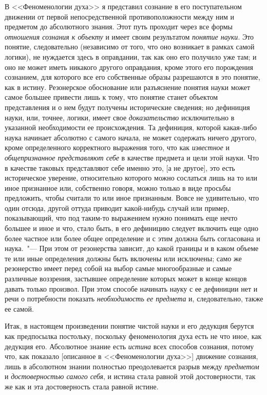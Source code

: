 В <<Феноменологии духа>> я представил сознание в
его поступательном движении от первой непосредственной
противоположности между ним и предметом до
абсолютного знания. Этот путь проходит через все формы
\emph{отношения сознания к объекту} и имеет своим
результатом \emph{понятие науки}. Это понятие, следовательно
(независимо от того, что оно возникает в рамках самой
логики), не нуждается здесь в оправдании, так как оно
его получило уже там; и оно не может иметь никакого
другого оправдания, кроме этого его порождения сознанием,
для которого все его собственные образы разрешаются
в это понятие, как в истину. Резонерское обоснование
или разъяснение понятия науки может самое большее
привести лишь к тому, что понятие станет объектом
представления и о нем будут получены исторические
сведения; но дефиниция науки, или, точнее, логики,
имеет свое \emph{доказательство} исключительно в указанной
необходимости ее происхождения. Та дефиниция, которой
какая-либо наука начинает абсолютно с самого начала,
не может содержать ничего другого, кроме определенного
корректного выражения того, что как \emph{известное}
и \emph{общепризнанное представляют себе} в качестве предмета
и цели этой науки. Что в качестве таковых представляют
себе именно это, [а не другое], это есть историческое
уверение, относительно которого можно сослаться
лишь на то или иное признанное или, собственно говоря,
можно только в виде просьбы предложить, чтобы считали
то или иное признанным. Вовсе не удивительно, что
один отсюда, другой оттуда приводит какой-нибудь случай
или пример, показывающий, что под таким-то выражением
нужно понимать еще нечто большее и иное и
что, стало быть, в его дефиницию следует включить еще
одно более частное или более общее определение и с
этим должна быть согласована и наука.~"--- При этом от
резонерства зависит, до какой границы и в каком объеме
те или иные определения должны быть включены или
исключены; само же резонерство имеет перед собой на
выбор самые многообразные и самые различные воззрения,
застывшее определение которых может в конце
концов давать только произвол. При этом способе начинать
науку с ее дефиниции нет и речи о потребности
показать \emph{необходимость ее предмета} и, следовательно,
также ее самой.

Итак, в настоящем произведении понятие чистой науки
и его дедукция берутся как предпосылка постольку,
поскольку феноменология духа есть не что иное, как дедукция
его. Абсолютное знание есть \emph{истина} всех способов
сознания, потому что, как показало [описанное в <<Феноменологии
духа>>] движение сознания, лишь в абсолютном
знании полностью преодолевается разрыв между
\emph{предметом} и \emph{достоверностью самого себя}, и истина стала
равной этой достоверности, так же как и эта достоверность
стала равной истине.

